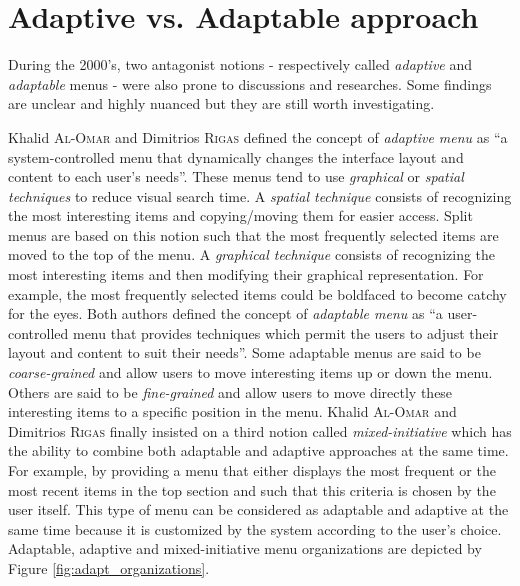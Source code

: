 \section{Adaptive vs. Adaptable approach}

During the 2000’s, two antagonist notions - respectively called 
\textit{adaptive} and \textit{adaptable} menus - were also prone to discussions 
and researches. Some findings are unclear and highly nuanced but they are still 
worth investigating.\newline

Khalid \textsc{Al-Omar} and Dimitrios \textsc{Rigas} \cite{alomar1} defined the 
concept of \textit{adaptive menu} as \enquote{a system-controlled menu that 
dynamically changes the interface layout and content to each user’s needs}. 
These menus tend to use \textit{graphical} or \textit{spatial techniques} to 
reduce visual search time. A \textit{spatial technique} consists of 
recognizing the most interesting items and copying/moving them for easier 
access. Split menus are based on this notion such that the 
most frequently selected items are moved to the top of the menu. A 
\textit{graphical technique} consists of recognizing the most interesting items 
and then modifying their graphical representation. For example, the most 
frequently selected items could be boldfaced to become catchy for the eyes. 
Both authors defined the concept of \textit{adaptable menu} as \enquote{a 
user-controlled menu that provides techniques which permit the users to adjust 
their layout and content to suit their needs}. Some adaptable menus are said to 
be \textit{coarse-grained} and allow users to move interesting items up or down 
the menu. Others are said to be \textit{fine-grained} and allow users to move 
directly these interesting items to a specific position in the menu. Khalid 
\textsc{Al-Omar} and Dimitrios \textsc{Rigas} finally insisted on a third notion 
called 
\textit{mixed-initiative} which has the ability to combine both adaptable and 
adaptive approaches at the same time. For example, by providing a menu that 
either displays the most frequent or the most recent items in the top section 
and such that this criteria is chosen by the user itself. This type of menu 
can be considered as adaptable and adaptive at the same time because it is 
customized by the system according to the user’s choice. Adaptable, 
adaptive and mixed-initiative menu organizations are depicted by Figure 
\ref{fig:adapt_organizations}.\newline

